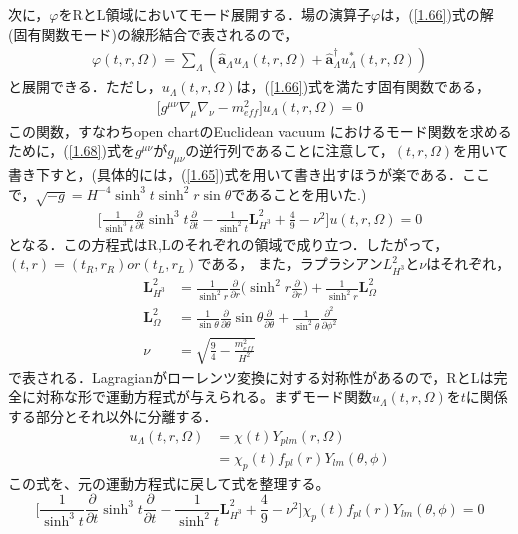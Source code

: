 次に，$\varphi$をRとL領域においてモード展開する．場の演算子$\varphi$は，(\ref{1.66})式の解(固有関数モード)の線形結合で表されるので，
\begin{align}
  \varphi(t,r,\Omega)=\sum_{\Lambda}(\hat{\bm{a}}_{\Lambda}u_{\Lambda}(t,r,\Omega)+\hat{\bm{a}}^{\dagger}_{\Lambda}u^{*}_{\Lambda}(t,r,\Omega))
\end{align}
と展開できる．ただし，$u_{\Lambda}(t,r,\Omega)$は，(\ref{1.66})式を満たす固有関数である，
\begin{align}
  \label{1.68}
\biggl[g^{\mu\nu}\nabla_{\mu}\nabla_{\nu}-m_{eff}^2\biggr]u_{\Lambda}(t,r,\Omega)=0
\end{align}
この関数，すなわちopen chartのEuclidean vacuum におけるモード関数を求めるために，(\ref{1.68})式を$g^{\mu\nu}$が$g_{\mu\nu}$の逆行列であることに注意して，$(t,r,\Omega)$を用いて書き下すと，(具体的には，(\ref{1.65})式を用いて書き出すほうが楽である．ここで，$\sqrt{-g}=H^{-4}\sinh^3t\sinh^2r\sin\theta$であることを用いた.)
\begin{align}
  \biggl[\frac{1}{\sinh^3t}\frac{\partial}{\partial t}\sinh^3t\frac{\partial}{\partial t}-\frac{1}{\sinh^2t}\bm{L}^2_{H^3}+\frac{4}{9}-\nu^2\biggr]u(t,r,\Omega)=0
\end{align}
となる．この方程式はR,Lのそれぞれの領域で成り立つ．したがって，$(t,r)=(t_{R},r_{R}) or (t_{L},r_{L})$である，
また，ラプラシアン$L_{H^3}^2$と$\nu$はそれぞれ，
\begin{align}
  \bm{L}_{H^3}^2&=\frac{1}{\sinh^2r}\frac{\partial}{\partial r}\biggl(\sinh^2r\frac{\partial}{\partial r}\biggr)+\frac{1}{\sinh^2r}\bm{L}_{\Omega}^2 \\
  \bm{L}_{\Omega}^2&=\frac{1}{\sin\theta}\frac{\partial}{\partial \theta}\sin{\theta}\frac{\partial}{\partial \theta}+\frac{1}{\sin^2{\theta}}
  \frac{\partial^2}{\partial \phi^2} \\
  \nu&=\sqrt{\frac{9}{4}-\frac{m^2_{eff}}{H^{2}}}
\end{align}
で表される．Lagragianがローレンツ変換に対する対称性があるので，RとLは完全に対称な形で運動方程式が与えられる。まずモード関数$u_{\Lambda}(t,r,\Omega)$を$t$に関係する部分とそれ以外に分離する．
\begin{align}
  u_{\Lambda}(t,r,\Omega)&=\chi(t)Y_{plm}(r,\Omega)\\
  &=\chi_p(t)f_{pl}(r)Y_{lm}(\theta,\phi)
 \end{align}
 この式を、元の運動方程式に戻して式を整理する。
 \begin{equation}
   \biggl[\frac{1}{\sinh^3t}\frac{\partial}{\partial t}\sinh^3t\frac{\partial}{\partial t}-\frac{1}{\sinh^2t}\bm{L}^2_{H^3}+\frac{4}{9}-\nu^2\biggr]\chi_p(t)f_{pl}(r)Y_{lm}(\theta,\phi)=0
 \end{equation}
